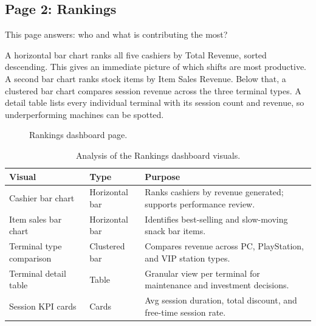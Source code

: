 \documentclass[12pt, a4paper]{report}
\begin{document}
\subsection{Page 2: Rankings}

This page answers: who and what is contributing the most?

A horizontal bar chart ranks all five cashiers by Total Revenue, sorted descending.
This gives an immediate picture of which shifts are most productive. A second bar
chart ranks stock items by Item Sales Revenue. Below that, a clustered bar chart
compares session revenue across the three terminal types. A detail table lists every
individual terminal with its session count and revenue, so underperforming machines
can be spotted.

\begin{figure}[H]
  \centering
  \caption{Rankings dashboard page.\label{fig:dash_rankings}}
\end{figure}

\begin{table}[H]
  \centering
  \caption{Analysis of the Rankings dashboard visuals.\label{tab:rank_analysis}}
  \begin{tabular}{p{3.5cm} p{2.5cm} p{7cm}}
    \toprule
    \textbf{Visual} & \textbf{Type} & \textbf{Purpose} \\
    \midrule
    Cashier bar chart
      & Horizontal bar
      & Ranks cashiers by revenue generated; supports performance review. \\[4pt]
    Item sales bar chart
      & Horizontal bar
      & Identifies best-selling and slow-moving snack bar items. \\[4pt]
    Terminal type comparison
      & Clustered bar
      & Compares revenue across PC, PlayStation, and VIP station types. \\[4pt]
    Terminal detail table
      & Table
      & Granular view per terminal for maintenance and investment decisions. \\[4pt]
    Session KPI cards
      & Cards
      & Avg session duration, total discount, and free-time session rate. \\
    \bottomrule
  \end{tabular}
\end{table}
\end{document}
